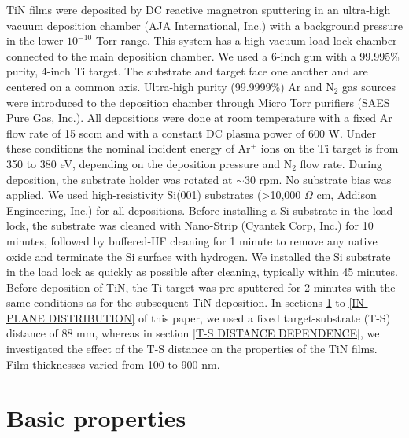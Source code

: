 TiN films were deposited by DC reactive magnetron sputtering in an ultra-high vacuum deposition chamber (AJA International, Inc.) with a background pressure in the lower  $10^{-10}$ Torr range. This system has a high-vacuum load lock chamber connected to the main deposition chamber. We used a 6-inch gun with a 99.995\% purity, 4-inch Ti target. The substrate and target face one another and are centered on a common axis. Ultra-high purity (99.9999\%) Ar and N$_{2}$ gas sources were introduced to the deposition chamber through Micro Torr purifiers (SAES Pure Gas, Inc.). All depositions were done at room temperature with a fixed Ar flow rate of 15 sccm and with a constant DC plasma power of 600 W.  Under these conditions the nominal incident energy of Ar$^{+}$ ions on the Ti target is from 350 to 380 eV, depending on the deposition pressure and N$_{2}$ flow rate.  During deposition, the substrate holder was rotated at $\sim$30 rpm. No substrate bias was applied. We used high-resistivity Si(001) substrates (>10,000 $\Omega$ cm, Addison Engineering, Inc.) for all depositions. Before installing a Si substrate in the load lock, the substrate was cleaned with Nano-Strip (Cyantek Corp, Inc.) for 10 minutes, followed by buffered-HF cleaning for 1 minute to remove any native oxide and terminate the Si surface with hydrogen. We installed the Si substrate in the load lock as quickly as possible after cleaning, typically within 45 minutes. Before deposition of TiN, the Ti target was pre-sputtered for 2 minutes with the same conditions as for the subsequent TiN deposition. In sections \ref{BASIC PROPERTIES} to \ref{IN-PLANE DISTRIBUTION} of this paper, we used a fixed target-substrate (T-S) distance of 88 mm, whereas in section \ref{T-S DISTANCE DEPENDENCE}, we investigated the effect of the T-S distance on the properties of the TiN films.  Film thicknesses varied from 100 to 900 nm.

\section{Basic properties}
\label{BASIC PROPERTIES}

